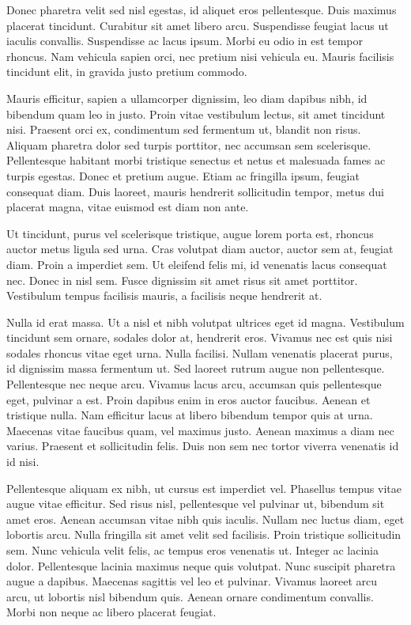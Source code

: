 Donec pharetra velit sed nisl egestas, id aliquet eros pellentesque. Duis maximus placerat tincidunt. Curabitur sit amet libero arcu. Suspendisse feugiat lacus ut iaculis convallis. Suspendisse ac lacus ipsum. Morbi eu odio in est tempor rhoncus. Nam vehicula sapien orci, nec pretium nisi vehicula eu. Mauris facilisis tincidunt elit, in gravida justo pretium commodo.

Mauris efficitur, sapien a ullamcorper dignissim, leo diam dapibus nibh, id bibendum quam leo in justo. Proin vitae vestibulum lectus, sit amet tincidunt nisi. Praesent orci ex, condimentum sed fermentum ut, blandit non risus. Aliquam pharetra dolor sed turpis porttitor, nec accumsan sem scelerisque. Pellentesque habitant morbi tristique senectus et netus et malesuada fames ac turpis egestas. Donec et pretium augue. Etiam ac fringilla ipsum, feugiat consequat diam. Duis laoreet, mauris hendrerit sollicitudin tempor, metus dui placerat magna, vitae euismod est diam non ante.

Ut tincidunt, purus vel scelerisque tristique, augue lorem porta est, rhoncus auctor metus ligula sed urna. Cras volutpat diam auctor, auctor sem at, feugiat diam. Proin a imperdiet sem. Ut eleifend felis mi, id venenatis lacus consequat nec. Donec in nisl sem. Fusce dignissim sit amet risus sit amet porttitor. Vestibulum tempus facilisis mauris, a facilisis neque hendrerit at.

Nulla id erat massa. Ut a nisl et nibh volutpat ultrices eget id magna. Vestibulum tincidunt sem ornare, sodales dolor at, hendrerit eros. Vivamus nec est quis nisi sodales rhoncus vitae eget urna. Nulla facilisi. Nullam venenatis placerat purus, id dignissim massa fermentum ut. Sed laoreet rutrum augue non pellentesque. Pellentesque nec neque arcu. Vivamus lacus arcu, accumsan quis pellentesque eget, pulvinar a est. Proin dapibus enim in eros auctor faucibus. Aenean et tristique nulla. Nam efficitur lacus at libero bibendum tempor quis at urna. Maecenas vitae faucibus quam, vel maximus justo. Aenean maximus a diam nec varius. Praesent et sollicitudin felis. Duis non sem nec tortor viverra venenatis id id nisi.

Pellentesque aliquam ex nibh, ut cursus est imperdiet vel. Phasellus tempus vitae augue vitae efficitur. Sed risus nisl, pellentesque vel pulvinar ut, bibendum sit amet eros. Aenean accumsan vitae nibh quis iaculis. Nullam nec luctus diam, eget lobortis arcu. Nulla fringilla sit amet velit sed facilisis. Proin tristique sollicitudin sem. Nunc vehicula velit felis, ac tempus eros venenatis ut. Integer ac lacinia dolor. Pellentesque lacinia maximus neque quis volutpat. Nunc suscipit pharetra augue a dapibus. Maecenas sagittis vel leo et pulvinar. Vivamus laoreet arcu arcu, ut lobortis nisl bibendum quis. Aenean ornare condimentum convallis. Morbi non neque ac libero placerat feugiat.

